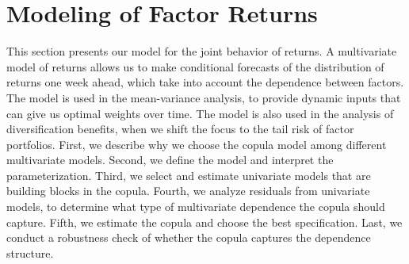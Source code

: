 
\section{Modeling of Factor Returns} %
\label{sec:modeling_of_factor_returns}

This section presents our model for the joint behavior of returns. A multivariate model of returns allows us to make conditional forecasts of the distribution of returns one week ahead, which take into account the dependence between factors. The model is used in the mean-variance analysis, to provide dynamic inputs that can give us optimal weights over time. The model is also used in the analysis of diversification benefits, when we shift the focus to the tail risk of factor portfolios. First, we describe why we choose the copula model among different multivariate models. Second, we define the model and interpret the parameterization. Third, we select and estimate univariate models that are building blocks in the copula. Fourth, we analyze residuals from univariate models, to determine what type of multivariate dependence the copula should capture. Fifth, we estimate the copula and choose the best specification. Last, we conduct a robustness check of whether the copula captures the dependence structure.







